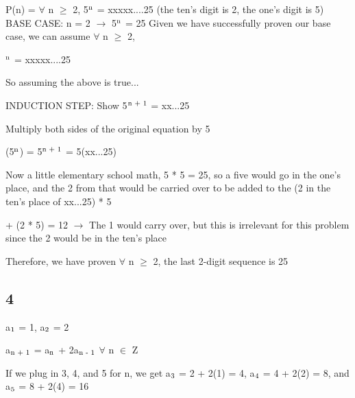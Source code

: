 \documentclass{article}
\begin{document}
\noindent P(n) = $\forall$ n $\geq$ 2, 5$\textsuperscript{n}$ = xxxxx....25 (the ten's digit is 2, the one's digit is 5) \vspace{0.5cm}\break
\noindent BASE CASE: n = 2 $\rightarrow$ 5$\textsuperscript{n}$ = 25  \vspace{0.5cm}\break
\noindent Given we have successfully proven our base case, we can assume $\forall$ n $\geq$ 2, \par{}$\textsuperscript{n}$ = xxxxx....25 \vspace{0.5cm}

\noindent So assuming the above is true... \vspace{0.5cm}

\noindent INDUCTION STEP: Show 5$\textsuperscript{n + 1}$ = xx...25 \vspace{0.5cm}

\noindent Multiply both sides of the original equation by 5 \vspace{0.5cm}

(5$\textsuperscript{n}$) = 5$\textsuperscript{n + 1}$ = 5(xx...25) \vspace{0.5cm}

\noindent Now a little elementary school math, 5 * 5 = 25, so a five would go in the one's place, and the 2 from that would be carried over to be added to the (2 in the ten's place of xx...25) * 5 \par\noindent

 + (2 * 5) = 12 $\rightarrow$ The 1 would carry over, but this is irrelevant for this problem since the 2 would be in the ten's place \vspace{0.5cm}

\noindent Therefore, we have proven $\forall$ n $\geq$ 2, the last 2-digit sequence is 25 \vspace{0.5cm}

\subsection{4}

\noindent a$\textsubscript{1}$ = 1, a$\textsubscript{2}$ = 2 \par

\noindent a$\textsubscript{n + 1}$ = a$\textsubscript{n}$ + 2a$\textsubscript{n - 1}$ $\forall$ n $\in$ Z \vspace{0.5cm}

\noindent If we plug in 3, 4, and 5 for n, we get a$\textsubscript{3}$ = 2 + 2(1) = 4, a$\textsubscript{4}$ = 4 + 2(2) = 8, and a$\textsubscript{5}$ = 8 + 2(4) = 16 \vspace{0.5cm}
\end{document}

